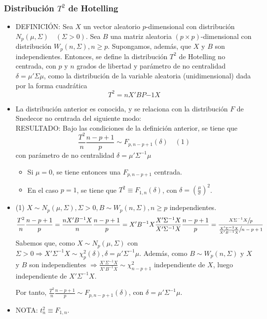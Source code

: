 \documentclass[11pt,a4paper]{article}
\begin{document}
\subsubsection{Distribución \texorpdfstring{$T^{2}$}) de Hotelling}
\begin{itemize}
\item DEFINICIÓN: Sea $X$ un vector aleatorio $p$-dimensional con distribución $N_{p}(\mu, \Sigma) \quad (\Sigma > 0)$. Sea $B$ una matriz aleatoria $(p \times p)$-dimensional con distribución $W_{p}(n, \Sigma), n \geq p$. Supongamos, además, que $X$ y $B$ son independientes. Entonces, se define la distribución $T^{2}$ de Hotelling no centrada, con $p$ y $n$ grados de libertad y parámetro de no centralidad $\delta = \mu'\Sigma\mu$, como la distribución de la variable aleatoria (unidimensional) dada por la forma cuadrática
$$T^{2} = nX'BP{-1}X$$

\item La distribución anterior es conocida, y se relaciona con la distribución $F$ de Snedecor no centrada del siguiente modo: \\
RESULTADO: Bajo las condiciones de la definición anterior, se tiene que
$$\frac{T^{2}}{n} \frac{n-p+1}{p} \sim F_{p, n-p+1}(\delta) \quad (1)$$
con parámetro de no centralidad $\delta = \mu'\Sigma^{-1}\mu$
\begin{itemize}
\item Si $\mu=0$, se tiene entonces una $F_{p, n-p+1}$ centrada.
\item En el caso $p=1$, se tiene que $T^{2} \equiv F_{1, n}(\delta)$, con $\delta = (\frac{\mu}{\sigma})^{2}$.
\end{itemize}

\item (1) $X \sim N_{p}(\mu, \Sigma), \Sigma > 0, B \sim W_{p}(n, \Sigma), n \geq p$ independientes.
$$\frac{T^{2}}{n} \frac{n-p+1}{p} = \frac{nX'B^{-1}X}{n} \frac{n-p+1}{p} = X'B^{-1}X \frac{X'\Sigma^{-1}X}{X'\Sigma^{-1}X} \frac{n-p+1}{p} = \frac{\sfrac{X\Sigma^{-1}X}{p}}{\sfrac{\frac{X'\Sigma^{-1}X}{X'B^{-1}X}}{n-p+1}}$$
Sabemos que, como $X \sim N_{p}(\mu, \Sigma)$ con $\Sigma > 0 \Rightarrow X'\Sigma^{-1}X \sim \chi^{2}_{p}(\delta), \delta = \mu'\Sigma^{-1}\mu$. Además, como $B \sim W_{p}(n, \Sigma)$ y $X$ y $B$ son independientes $\Rightarrow \frac{X'\Sigma^{-1}X}{X'B^{-1}X} \sim \chi_{n-p+1}^{2}$ independiente de $X$, luego independiente de $X'\Sigma^{-1}X$.

Por tanto, $\frac{T^{2}}{n}\frac{n-p+1}{p} \sim F_{p, n-p+1}(\delta)$, con $\delta = \mu'\Sigma^{-1}\mu$.

\item NOTA: $t_{n}^{2} \equiv F_{1, n}$.
\end{itemize}
\end{document}
